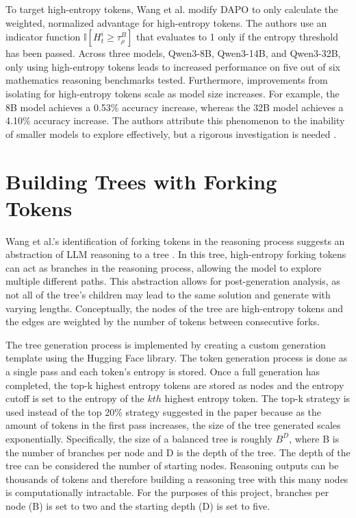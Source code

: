\documentclass{article}
\begin{document}
To target high-entropy tokens, Wang et al. modify DAPO to only calculate the weighted, normalized advantage for high-entropy tokens. The authors use an indicator function $\mathbb{I}\!\left[ H^{i}_{t} \ge \tau^{B}_{\rho} \right]$
that evaluates to 1 only if the entropy threshold has been passed. Across three models, Qwen3-8B, Qwen3-14B, and Qwen3-32B, only using high-entropy tokens leads to increased performance on five out of six mathematics reasoning benchmarks tested. Furthermore, improvements from isolating for high-entropy tokens scale as model size increases. For example, the 8B model achieves a 0.53\% accuracy increase, whereas the 32B model achieves a 4.10\% accuracy increase. The authors attribute this phenomenon to the inability of smaller models to explore effectively, but a rigorous investigation is needed \cite{wang_beyond_2025}.

\section{Building Trees with Forking Tokens}

Wang et al.'s identification of forking tokens in the reasoning process suggests an abstraction of LLM reasoning to a tree \cite{wang_beyond_2025}. In this tree, high-entropy forking tokens can act as branches in the reasoning process, allowing the model to explore multiple different paths. This abstraction allows for post-generation analysis, as not all of the tree’s children may lead to the same solution and generate with varying lengths. Conceptually, the nodes of the tree are high-entropy tokens and the edges are weighted by the number of tokens between consecutive forks.

The tree generation process is implemented by creating a custom generation template using the Hugging Face library. The token generation process is done as a single pass and each token’s entropy is stored. Once a full generation has completed, the top-k highest entropy tokens are stored as nodes and the entropy cutoff is set to the entropy of the $kth$ highest entropy token. The top-k strategy is used instead of the top 20\% strategy suggested in the paper because as the amount of tokens in the first pass increases, the size of the tree generated scales exponentially. Specifically, the size of a balanced tree is roughly $B^D$, where B is the number of branches per node and D is the depth of the tree. The depth of the tree can be considered the number of starting nodes. Reasoning outputs can be thousands of tokens and therefore building a reasoning tree with this many nodes is computationally intractable. For the purposes of this project, branches per node (B) is set to two and the starting depth (D) is set to five.
\end{document}
